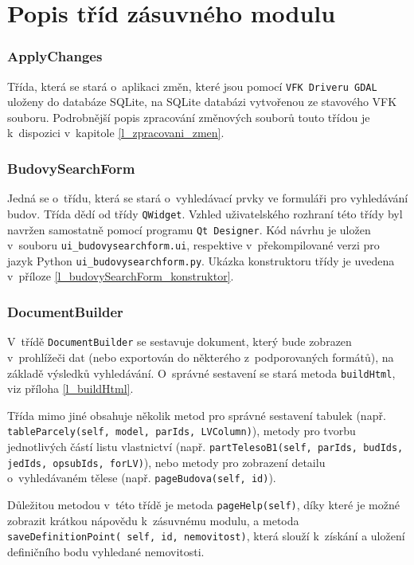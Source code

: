 \documentclass[a4paper,12pt,oneside]{book}
\begin{document}
\clearpage
\section{Popis tříd zásuvného modulu}

\subsubsection{ApplyChanges}
Třída, která se stará o~aplikaci změn, které jsou pomocí \texttt{VFK Driveru GDAL} uloženy do databáze SQLite, na SQLite databázi vytvořenou ze stavového VFK souboru. Podrobnější popis zpracování změnových souborů touto třídou je k~dispozici v~kapitole \ref{l_zpracovani_zmen}.

\subsubsection{BudovySearchForm}
Jedná se o~třídu, která se stará o~vyhledávací prvky ve formuláři pro vyhledávání budov. Třída dědí od třídy \texttt{QWidget}. Vzhled uživatelského rozhraní této třídy byl navržen samostatně pomocí programu \texttt{Qt Designer}. Kód návrhu je uložen v~souboru \texttt{ui\_budovysearchform.ui}, respektive v~překompilované verzi pro jazyk Python \texttt{ui\_budovysearchform.py}. Ukázka konstruktoru třídy je uvedena v~příloze \ref{l_budovySearchForm_konstruktor}.

\subsubsection{DocumentBuilder}
V~třídě \texttt{DocumentBuilder} se sestavuje dokument, který bude zobrazen v~prohlížeči dat (nebo exportován do některého z~podporovaných formátů), na základě výsledků vyhledávání. O~správné sestavení se stará metoda \texttt{buildHtml}, viz příloha \ref{l_buildHtml}. 

Třída mimo jiné obsahuje několik metod pro správné sestavení tabulek (např. \texttt{tableParcely(self, model, parIds, LVColumn)}), metody pro tvorbu jednotlivých částí listu vlastnictví (např. \texttt{partTelesoB1(self, parIds, budIds, jedIds, opsubIds, forLV)}), nebo metody pro zobrazení detailu o~vyhledávaném tělese (např. \texttt{pageBudova(self, id)}).

Důležitou metodou v~této třídě je metoda \texttt{pageHelp(self)}, díky které je možné zobrazit krátkou nápovědu k~zásuvnému modulu, a metoda \texttt{saveDefinitionPoint( self, id, nemovitost)}, která slouží k~získání a uložení definičního bodu vyhledané nemovitosti.
\end{document}
